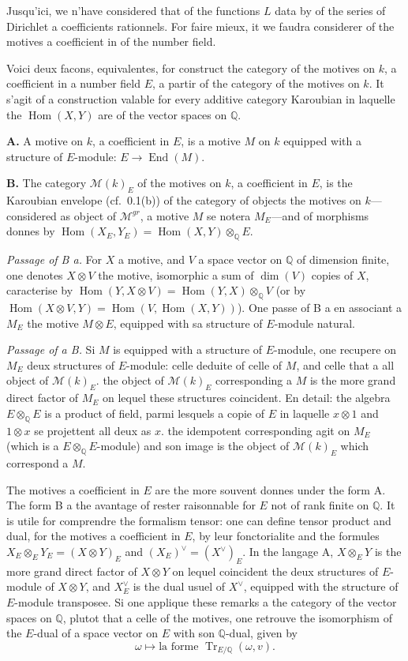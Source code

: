 \documentclass[12pt,a4paper]{article}
\theoremstyle{plain}
\theoremstyle{definition}
\theoremstyle{remark}
\DeclareMathOperator{\Hom}{Hom}
\DeclareMathOperator{\End}{End}
\DeclareMathOperator{\Tr}{Tr}
\newcommand{\Q}{\mathbb{Q}}
\begin{document}
Jusqu'ici, we n'have considered that of the functions $L$ data by of the series of
Dirichlet a coefficients rationnels. For faire mieux, it we faudra considerer of the
motives a coefficient in of the number field.

Voici deux facons, equivalentes, for construct the category of the motives on $k$,
a coefficient in a number field $E$, a partir of the category of the motives on $k$.
It s'agit of a construction valable for every additive category Karoubian
in laquelle the $\Hom(X, Y)$ are of the vector spaces on $\Q$.

\textbf{A.} A motive on $k$, a coefficient in $E$, is a motive $M$ on $k$ equipped with a structure
of $E$-module: $E \to \End(M)$.

\textbf{B.} The category $\mathcal{M}(k)_E$ of the motives on $k$, a coefficient in $E$, is the Karoubian envelope (cf.~0.1(b)) of the category of objects the motives on $k$---considered
as object of $\mathcal{M}^{gr}$, a motive $M$ se notera $M_E$---and of morphisms donnes by
$\Hom(X_E, Y_E) = \Hom(X, Y) \otimes_\Q E$.

\textit{Passage of B a.} For $X$ a motive, and $V$ a space vector on $\Q$ of dimension
finite, one denotes $X \otimes V$ the motive, isomorphic a sum of $\dim(V)$ copies of $X$,
caracterise by $\Hom(Y, X \otimes V) = \Hom(Y, X) \otimes_\Q V$ (or by
$\Hom(X \otimes V, Y) = \Hom(V, \Hom(X, Y))$). One passe of B a en associant a
$M_E$ the motive $M \otimes E$, equipped with sa structure of $E$-module natural.

\textit{Passage of a B.} Si $M$ is equipped with a structure of $E$-module, one recupere on
$M_E$ deux structures of $E$-module: celle deduite of celle of $M$, and celle that a all
object of $\mathcal{M}(k)_E$. the object of $\mathcal{M}(k)_E$ corresponding a $M$ is the more grand direct factor of $M_E$ on lequel these structures coincident. En detail: the algebra $E \otimes_\Q E$ is a
product of field, parmi lesquels a copie of $E$ in laquelle $x \otimes 1$ and $1 \otimes x$ se
projettent all deux as $x$. the idempotent corresponding agit on $M_E$ (which is
a $E \otimes_\Q E$-module) and son image is the object of $\mathcal{M}(k)_E$ which correspond a $M$.

The motives a coefficient in $E$ are the more souvent donnes under the form A. The
form B a the avantage of rester raisonnable for $E$ not of rank finite on $\Q$. It is
utile for comprendre the formalism tensor: one can define tensor product and
dual, for the motives a coefficient in $E$, by leur fonctorialite and the formules
$X_E \otimes_E Y_E = (X \otimes Y)_E$ and $(X_E)^\vee = (X^\vee)_E$. In the langage A, $X \otimes_E Y$
is the more grand direct factor of $X \otimes Y$ on lequel coincident the deux structures of
$E$-module of $X \otimes Y$, and $X^\vee_E$ is the dual usuel of $X^\vee$, equipped with the structure of
$E$-module transposee. Si one applique these remarks a the category of the vector spaces
on $\Q$, plutot that a celle of the motives, one retrouve the isomorphism of the $E$-dual of a space
vector on $E$ with son $\Q$-dual, given by
\[
\omega \mapsto \text{la forme } \Tr_{E/\Q}(\omega, v).
\]
\end{document}
